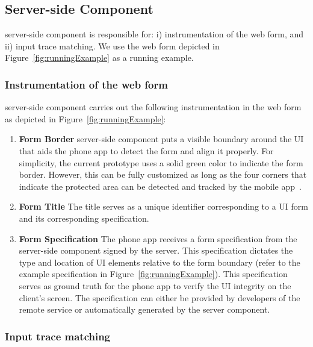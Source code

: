 \subsection{Server-side Component}
\label{sec:systemDesign:webserver}

\name server-side component is responsible for: i) instrumentation of the web form, and ii) input trace matching. We use the web form depicted in Figure~\ref{fig:runningExample} as a running example.

\subsubsection{Instrumentation of the web form}
\label{sec:systemDesign:webserver:instr}

\name server-side component carries out the following instrumentation in the web form as depicted in Figure~\ref{fig:runningExample}:

\begin{enumerate}	

\item[\one] \textbf{Form Border} \sysname server-side component puts a visible boundary around the UI that aids the \sysname phone app to detect the form and align it properly. For simplicity, the current prototype uses a solid green color to indicate the form border.
However, this can be fully customized as long as the four corners that indicate the protected area can be detected and tracked by the mobile app~\cite{zhang2002visual}.



\item[\two] \textbf{Form Title} The title serves as a unique identifier corresponding to a UI form and its corresponding specification.

\item[\three] \textbf{Form Specification}
The \sysname phone app receives a form specification from the server-side component signed by the server. This specification dictates the type and location of UI elements relative to the form boundary (refer to the example specification in Figure~\ref{fig:runningExample}). This specification serves as ground truth for the phone app to verify the UI integrity on the client's screen. The specification can either be provided by developers of the remote service or automatically generated by the \sysname server component.

\end{enumerate}

\subsubsection{Input trace matching}

